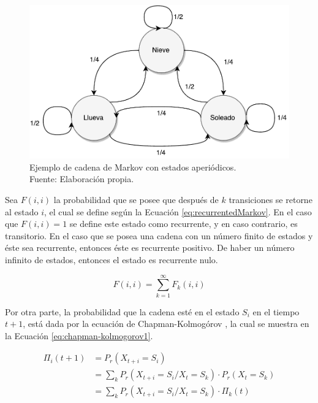 \begin{figure}[ht!]
	\centering
	\includegraphics[scale=0.5]{images/EjCadenaMarkov-Aperiodica.pdf}
	\caption[Ejemplo de cadena de Markov con estados aperi\'odicos.]{Ejemplo de cadena de Markov con estados aperi\'odicos.\\Fuente: Elaboraci\'on propia.}
	\label{fig:ejCadenaMarkov-Aperiodica}
\end{figure}

\normalsize{Sea $F(i,i)$ la probabilidad que se posee que despu\'es de $k$ transiciones se retorne al estado $i$, el cual se define seg\'un la Ecuaci\'on} \ref{eq:recurrentedMarkov}. \normalsize{En el caso que $F(i,i)=1$ se define este estado como recurrente, y en caso contrario, es transitorio. En el caso que se posea una cadena con un n\'umero finito de estados y \'este sea recurrente, entonces \'este es recurrente positivo. De haber un n\'umero infinito de estados, entonces el estado es recurrente nulo.}

\begin{equation} \label{eq:recurrentedMarkov}
	F(i,i) = \sum_{k=1}^{\infty}{F_k(i,i)}
\end{equation}

Por otra parte, la probabilidad que la cadena est\'e en el estado $S_i$ en el tiempo $t+1$, est\'a dada por la ecuaci\'on de Chapman-Kolmog\'orov \citep{Papoulis1984}, la cual se muestra en la Ecuaci\'on \ref{eq:chapman-kolmogorov1}.

\begin{equation} \label{eq:chapman-kolmogorov1}
\begin{split}
	\Pi_{i} (t+1) &= P_r(X_{t+i}=S_i) \\
				  &= \sum _{k} P_r(X_{t+i} = S_i / X_t = S_k) \cdot P_r(X_t = S_k)\\
				  &= \sum _{k} P_r(X_{t+i} = S_i / X_t = S_k) \cdot \Pi_{k} (t)
\end{split}	
\end{equation}

